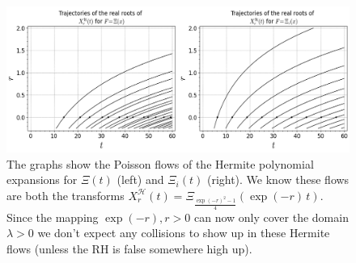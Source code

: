 \documentclass[a4paper,11pt,twoside]{amsart}
\begin{document}
\begin{small}
\pagebreak
\noindent{}
\begin{figure}[H]
  \noindent
  \includegraphics[width=1\linewidth]{HermiteFlowdouble.jpeg}
  \caption{The graphs show the Poisson flows of the Hermite polynomial expansions for $\Xi(t)$ (left) and $\Xi_i(t)$ (right). We know these flows are both the transforms $X^\mathcal{H}_r(t) =\Xi_{\frac{\exp(-r)^2-1}{4}} (\exp(-r)\,t)$. Since the mapping $\exp(-r), r > 0$ can now only cover the domain $\lambda > 0$ we don't expect any collisions to show up in these Hermite flows (unless the RH is false somewhere high up).}
  \label{fig:flowH1}
\end{figure}


\end{small}
\end{document}
